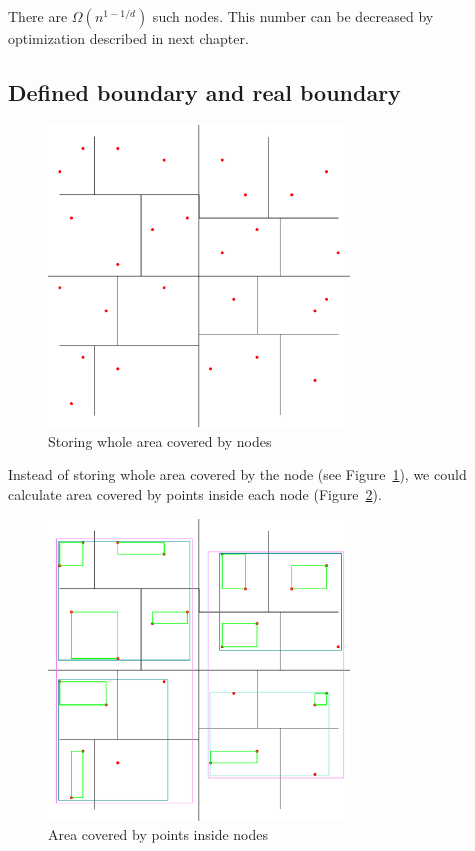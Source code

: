 \documentclass[10pt,a4paper]{article}
\begin{document}
\bigskip

There are $\Omega (n^{1-1/d})$ such nodes. This number can be decreased by optimization described in next chapter.

\subsection{Defined boundary and real boundary}

\begin{figure}
\centering
  \includegraphics[width=8cm]{Figure1}
  \caption{Storing whole area covered by nodes}
  \label{fig:covered}
\end{figure}

Instead of storing whole area covered by the node (see Figure~\ref{fig:covered}), we could calculate area covered by points inside each node (Figure~\ref{fig:inside}).

\begin{figure}
\centering
  \includegraphics[width=8cm]{Figure2}
  \caption{Area covered by points inside nodes}
  \label{fig:inside}
\end{figure}
\end{document}
